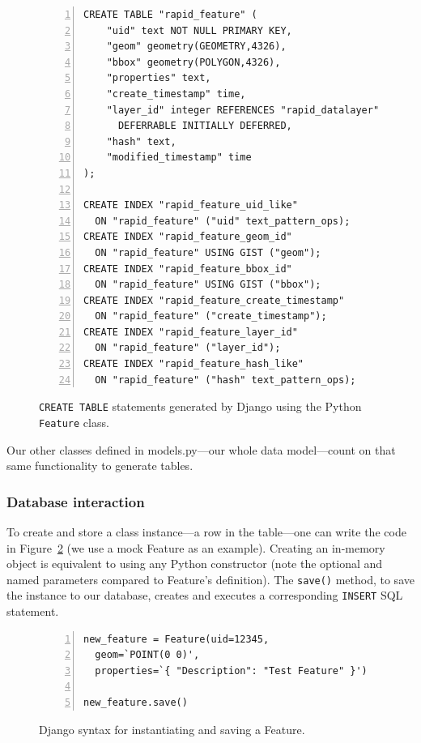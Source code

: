 
\begin{figure}[ht]
\begin{Verbatim}[samepage=true,baselinestretch=1,numbers=left,xleftmargin=12mm]
CREATE TABLE "rapid_feature" (
    "uid" text NOT NULL PRIMARY KEY,
    "geom" geometry(GEOMETRY,4326),
    "bbox" geometry(POLYGON,4326),
    "properties" text,
    "create_timestamp" time,
    "layer_id" integer REFERENCES "rapid_datalayer" ("uid")
      DEFERRABLE INITIALLY DEFERRED,
    "hash" text,
    "modified_timestamp" time
);

CREATE INDEX "rapid_feature_uid_like"
  ON "rapid_feature" ("uid" text_pattern_ops);
CREATE INDEX "rapid_feature_geom_id"
  ON "rapid_feature" USING GIST ("geom");
CREATE INDEX "rapid_feature_bbox_id"
  ON "rapid_feature" USING GIST ("bbox");
CREATE INDEX "rapid_feature_create_timestamp"
  ON "rapid_feature" ("create_timestamp");
CREATE INDEX "rapid_feature_layer_id"
  ON "rapid_feature" ("layer_id");
CREATE INDEX "rapid_feature_hash_like"
  ON "rapid_feature" ("hash" text_pattern_ops);
\end{Verbatim}
\caption{\texttt{CREATE TABLE} statements generated by Django using the Python \texttt{Feature} class.}
\label{fig:sql}
\end{figure}

Our other classes defined in models.py---our whole data model---count on that same functionality to generate tables.

\subsubsection{Database interaction}
To create and store a class instance---a row in the table---one can write the code in Figure~\ref{fig:save} (we use a mock Feature as an example). Creating an in-memory object is equivalent to using any Python constructor (note the optional and named parameters compared to Feature's definition). The \texttt{save()} method, to save the instance to our database, creates and executes a corresponding \texttt{INSERT} SQL statement.

\begin{figure}[ht]
\begin{Verbatim}[samepage=true,baselinestretch=1,numbers=left,xleftmargin=12mm]
new_feature = Feature(uid=12345,
  geom=`POINT(0 0)',
  properties=`{ "Description": "Test Feature" }')
  
new_feature.save()
\end{Verbatim}
\caption{Django syntax for instantiating and saving a Feature.}
\label{fig:save}
\end{figure}

